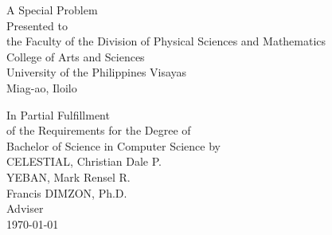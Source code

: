 \begin{titlepage}
\centering


\vspace{0.875cm}
A Special Problem\\
Presented to\\
the Faculty of the Division of Physical Sciences and Mathematics\\
College of Arts and Sciences\\
University of the Philippines Visayas\\
Miag-ao, Iloilo

\vspace{0.875cm}
In Partial Fulfillment\\
of the Requirements for the Degree of\\
Bachelor of Science in Computer Science
\vspace{1.75cm}
by\\

\vspace{0.1cm}
CELESTIAL, Christian Dale P.\\
YEBAN, Mark Rensel R.\\

\vspace{0.875cm}
Francis DIMZON, Ph.D. \\
Adviser\\


\vspace{0.875cm}
\today
\end{titlepage}

